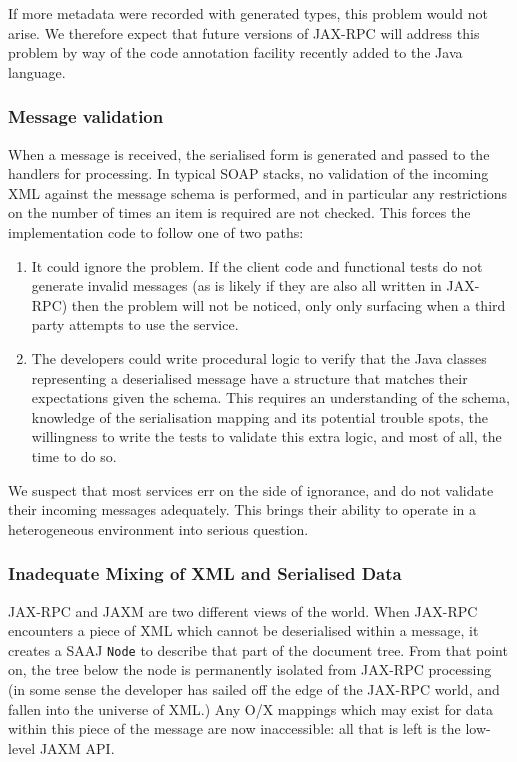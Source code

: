 If more metadata were recorded with generated types, this problem would not
arise. We therefore expect that future versions of JAX-RPC will address this 
problem by way of the code annotation facility recently added to the Java
language. 

\subsubsection{Message validation}
\label{objections:o-x:validation}

When a message is received, the serialised form is generated and
passed to the handlers for processing. In typical SOAP stacks,
no validation of the incoming XML against the message schema is
performed, and in particular any restrictions on the number of times
an item is required are not checked. This forces the implementation
code to follow one of two paths:
\begin{enumerate}

\item It could ignore the problem. If the client code and functional
tests do not generate invalid messages (as is likely if they are also
all written in JAX-RPC) then the problem will not be noticed, only
only surfacing when a third party attempts to use the service.

\item The developers could write procedural logic to verify that the
Java classes representing a deserialised message have a structure that
matches their expectations given the schema. This requires an
understanding of the schema, knowledge of the serialisation mapping
and its potential trouble spots, the willingness to write the tests to
validate this extra logic, and most of all, the time to do so.

\end{enumerate}

We suspect that most services err on the side of ignorance, and do not
validate their incoming messages adequately. This brings their ability
to operate in a heterogeneous environment into serious question.

\subsubsection{Inadequate Mixing of XML and Serialised Data}
\label{objections:o-x:mixing}

JAX-RPC and JAXM are two different views of the world. When JAX-RPC
encounters a piece of XML which cannot be deserialised within a
message, it creates a SAAJ {\tt Node} to describe that part of the
document tree.  From that point on, the tree below the node is
permanently isolated from JAX-RPC processing (in some sense the
developer has sailed off the edge of the JAX-RPC world, and fallen
into the universe of XML.) Any O/X mappings which may exist for data
within this piece of the message are now inaccessible: all that is
left is the low-level JAXM API.

